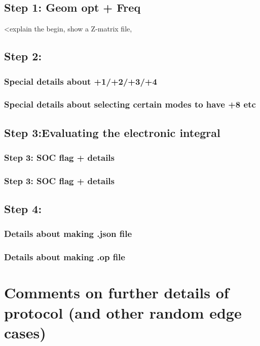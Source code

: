 \documentclass[letterpaper, 12pt, oneside]{report}
\begin{document}
\subsection{Step 1: Geom opt + Freq}
<explain the begin, show a Z-matrix file, 
\subsection{Step 2:}
\subsubsection{Special details about +1/+2/+3/+4}
\subsubsection{Special details about selecting certain modes to have +8 etc}

\subsection{Step 3:Evaluating the electronic integral}
\subsubsection{Step 3: SOC flag + details}
\subsubsection{Step 3: SOC flag + details}

\subsection{Step 4:}
\subsubsection{Details about making .json file}
\subsubsection{Details about making .op file}


\section{Comments on further details of protocol (and other random edge cases)} 
\end{document}
